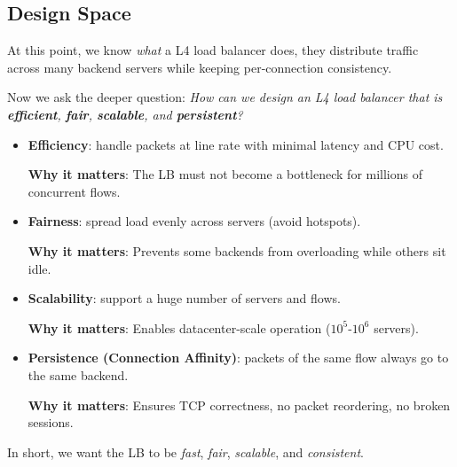 \subsection{Design Space}

At this point, we know \emph{what} a L4 load balancer does, they distribute traffic across many backend servers while keeping per-connection consistency.

\highspace
Now we ask the deeper question: \emph{How can we design an L4 load balancer that is \textbf{efficient}, \textbf{fair}, \textbf{scalable}, and \textbf{persistent}?}
\begin{itemize}
    \item \textbf{Efficiency}: handle packets at line rate with minimal latency and CPU cost.

    \textcolor{Green3}{ \textbf{Why it matters}}: The LB must not become a bottleneck for millions of concurrent flows.


    \item \textbf{Fairness}: spread load evenly across servers (avoid hotspots).

    \textcolor{Green3}{ \textbf{Why it matters}}: Prevents some backends from overloading while others sit idle.
    
    
    \item \textbf{Scalability}: support a huge number of servers and flows.

    \textcolor{Green3}{ \textbf{Why it matters}}: Enables datacenter-scale operation ($10^5$-$10^6$ servers).
    
    
    \item \textbf{Persistence (Connection Affinity)}: packets of the same flow always go to the same backend.

    \textcolor{Green3}{ \textbf{Why it matters}}: Ensures TCP correctness, no packet reordering, no broken sessions.
\end{itemize}
In short, we want the LB to be \emph{fast}, \emph{fair}, \emph{scalable}, and \emph{consistent}.

